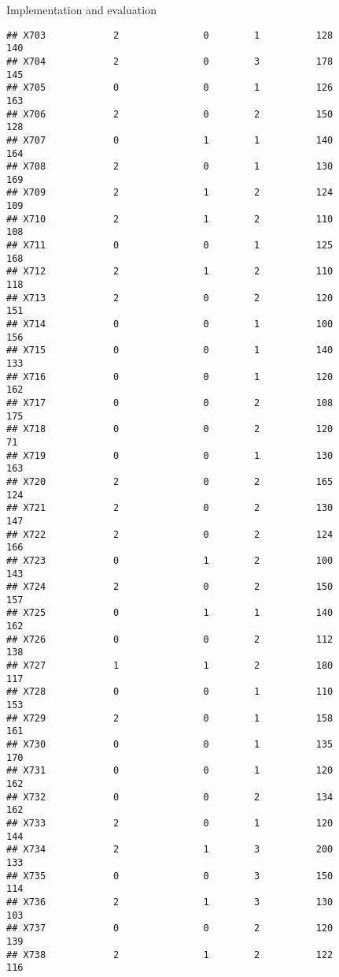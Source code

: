 \documentclass[
  ignorenonframetext,
]{beamer}
\begin{document}
\begin{frame}[fragile]{Implementation and evaluation}
\begin{verbatim}
## X703            2               0        1          128            140
## X704            2               0        3          178            145
## X705            0               0        1          126            163
## X706            2               0        2          150            128
## X707            0               1        1          140            164
## X708            2               0        1          130            169
## X709            2               1        2          124            109
## X710            2               1        2          110            108
## X711            0               0        1          125            168
## X712            2               1        2          110            118
## X713            2               0        2          120            151
## X714            0               0        1          100            156
## X715            0               0        1          140            133
## X716            0               0        1          120            162
## X717            0               0        2          108            175
## X718            0               0        2          120             71
## X719            0               0        1          130            163
## X720            2               0        2          165            124
## X721            2               0        2          130            147
## X722            2               0        2          124            166
## X723            0               1        2          100            143
## X724            2               0        2          150            157
## X725            0               1        1          140            162
## X726            0               0        2          112            138
## X727            1               1        2          180            117
## X728            0               0        1          110            153
## X729            2               0        1          158            161
## X730            0               0        1          135            170
## X731            0               0        1          120            162
## X732            0               0        2          134            162
## X733            2               0        1          120            144
## X734            2               1        3          200            133
## X735            0               0        3          150            114
## X736            2               1        3          130            103
## X737            0               0        2          120            139
## X738            2               1        2          122            116

\end{verbatim}
\end{frame}
\end{document}
